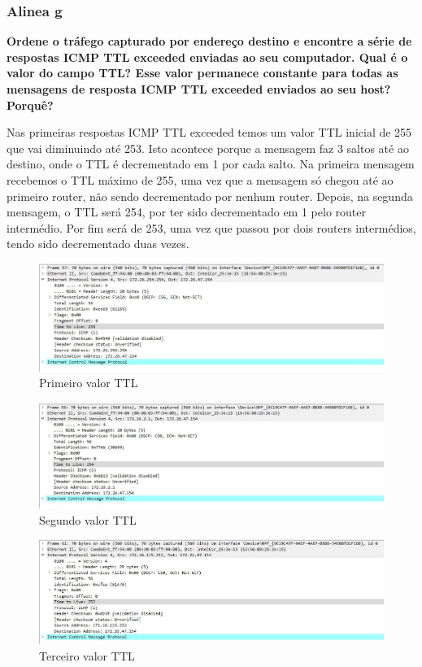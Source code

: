 \documentclass{article}
\begin{document}
\subsubsection{Alinea g}
\textbf{Ordene o tráfego capturado por endereço destino e encontre a série de respostas ICMP TTL exceeded enviadas ao seu computador. Qual é o valor do campo TTL? Esse valor permanece constante para todas as mensagens de resposta ICMP TTL exceeded enviados ao seu host? Porquê?} \\\par
Nas primeiras respostas ICMP TTL exceeded temos um valor TTL inicial de 255 que vai diminuindo até 253. Isto acontece porque a mensagem faz 3 saltos até ao destino, onde o TTL é decrementado em 1 por cada salto. Na primeira mensagem recebemos o TTL máximo de 255, uma vez que a mensagem só chegou até ao primeiro router, não sendo decrementado por nenhum router. Depois, na segunda mensagem, o TTL será 254, por ter sido decrementado em 1 pelo router intermédio. Por fim será de 253, uma vez que passou por dois routers intermédios, tendo sido decrementado duas vezes.\\

\begin{figure}[h]
	\centering
	\includegraphics[scale = 0.5]{ttl-2g2.JPG}
	\caption{Primeiro valor TTL}
\end{figure}

\newpage

\begin{figure}[h]
	\centering
	\includegraphics[scale = 0.5]{ttl-2g.JPG}
	\caption{Segundo valor TTL}
\end{figure}

\begin{figure}[h]
	\centering
	\includegraphics[scale = 0.5]{ttl-2g3.JPG}
	\caption{Terceiro valor TTL}
\end{figure}
\end{document}
